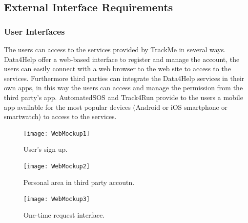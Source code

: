 \documentclass[a4paper]{article}
\begin{document}
\subsection{External Interface Requirements}

\subsubsection{User Interfaces}

The users can access to the services provided by TrackMe in several ways.
Data4Help offer a web-based interface to register and manage the account, the users can easily connect with a web browser to the web site to access to the services.
\newline Furthermore third parties can integrate the Data4Help services in their own apps, in this way the users can access and manage the permission from the third party's app.
AutomatedSOS and Track4Run provide to the users a mobile app available for the most popular devices (Android or iOS smartphone or smartwatch) to access to the services.

\vspace{1cm}

\begin{figure}[H]
    \centering
    \texttt{[image: WebMockup1]}
    \caption{User's sign up.}
    \label{fig:my_label}
\end{figure}

\begin{figure}[H]
    \centering
    \texttt{[image: WebMockup2]}
    \caption{Personal area in third party accoutn.}
    \label{fig:my_label}
\end{figure}

\vspace{0.5cm}

\begin{figure}[H]
    \centering
    \texttt{[image: WebMockup3]}
    \caption{One-time request interface.}
    \label{fig:my_label}
\end{figure}
\end{document}
